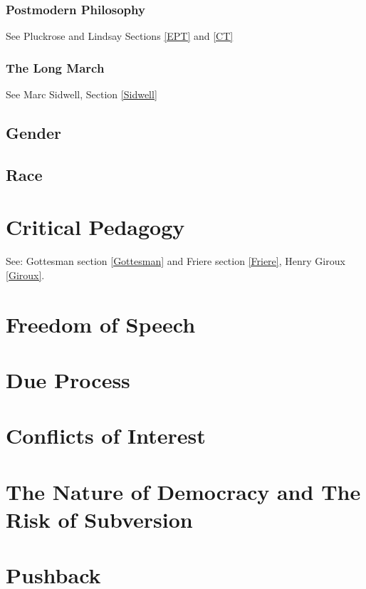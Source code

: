 \documentclass[10pt,titlepage]{book}
\begin{document}
\subsubsection{Postmodern Philosophy}

See Pluckrose and Lindsay Sections \ref{EPT} and \ref{CT} 

\subsubsection{The Long March}\label{LongMarch}

See Marc Sidwell, Section \ref{Sidwell}

\subsection{Gender}

\subsection{Race}

\section{Critical Pedagogy}

See: Gottesman section \ref{Gottesman} and Friere section \ref{Friere}, Henry Giroux \ref{Giroux}.


\section{Freedom of Speech}

\section{Due Process}

\section{Conflicts of Interest}

\section{The Nature of Democracy and The Risk of Subversion}

\section{Pushback}
\end{document}
